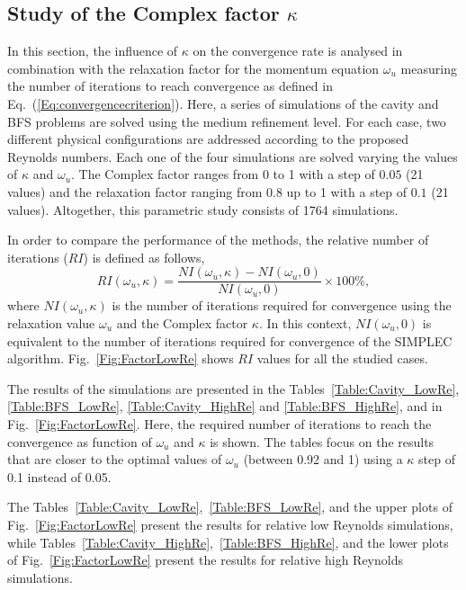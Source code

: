 \documentclass[final,3p,times,11pt,onecolumn]{myElsarticle}
\numberwithin{equation}{section}
\begin{document}
\subsection{Study of the Complex factor $\kappa$}
In this section, the influence of $\kappa$ on the convergence rate is analysed in combination with the relaxation factor for the momentum equation $\omega_{u}$ measuring the number of iterations to reach convergence as defined in Eq.~(\ref{Eq:convergencecriterion}). Here, a series of simulations of the cavity and BFS problems are solved using the medium refinement level. For each case, two different physical configurations are addressed according to the proposed Reynolds numbers. Each one of the four simulations are solved varying the values of $\kappa$ and $\omega_{u}$. The Complex factor ranges from 0 to 1 with a step of $0.05$ (21 values) and the relaxation factor ranging from 0.8 up to 1 with a step of $0.1$ (21 values). Altogether, this parametric study consists of 1764 simulations.

In order to compare the performance of the methods, the relative number of iterations ($RI$) is defined as follows, 
\begin{equation}
\label{Eq:relativeIndex}
RI(\omega_u, \kappa)
=
\dfrac
{
NI(\omega_u, \kappa) - NI(\omega_u, 0)
}
{
NI(\omega_u, 0)
}
\times
100 \%,
\end{equation}
where $NI(\omega_u, \kappa)$ is the number of iterations required for convergence using the relaxation value $\omega_u$ and the Complex factor $\kappa$. In this context, $NI(\omega_u, 0)$ is equivalent to the number of iterations required for convergence of the SIMPLEC algorithm. Fig.~\ref{Fig:FactorLowRe} shows $RI$ values for all the studied cases.

The results of the simulations are presented in the Tables~\ref{Table:Cavity_LowRe}, \ref{Table:BFS_LowRe}, \ref{Table:Cavity_HighRe} and \ref{Table:BFS_HighRe}, and in Fig.~\ref{Fig:FactorLowRe}. Here, the required number of iterations to reach the convergence as function of $\omega_u$ and $\kappa$ is shown. The tables focus on the results that are closer to the optimal values of $\omega_u$ (between 0.92 and 1) using a $\kappa$ step of 0.1 instead of 0.05. 
 
The Tables~\ref{Table:Cavity_LowRe},~\ref{Table:BFS_LowRe}, and the upper plots of Fig.~\ref{Fig:FactorLowRe} present the results for relative low Reynolds simulations, while Tables~\ref{Table:Cavity_HighRe},~\ref{Table:BFS_HighRe}, and the lower plots of Fig.~\ref{Fig:FactorLowRe} present the results for relative high Reynolds simulations. 
\end{document}
